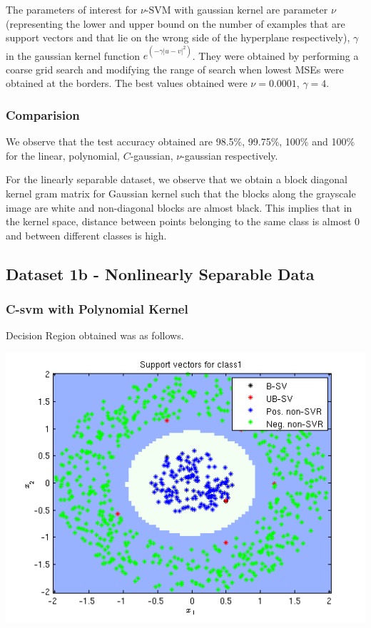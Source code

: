 \documentclass{article}
\begin{document}
The parameters of interest for $\nu$-SVM with gaussian kernel are parameter $\nu$(representing the lower and upper bound on the number of examples that are support vectors and that lie on the wrong side of the hyperplane respectively), $\gamma$ in the gaussian kernel function $e^{(-\gamma|u-v|^{2})}$. They were obtained by performing a coarse grid search and modifying the range of search when lowest MSEs were obtained at the borders.
The best values obtained were $\nu=0.0001$, $\gamma=4$.

\subsubsection{Comparision}
We observe that the test accuracy obtained are 98.5\%, 99.75\%, 100\% and 100\% for the linear, polynomial, $C$-gaussian, $\nu$-gaussian respectively. 

For the linearly separable dataset, we observe that we obtain a block diagonal kernel gram matrix for Gaussian kernel such that the blocks along the grayscale image are white and non-diagonal blocks are almost black. This implies that in the kernel space, distance between points belonging to the same class is almost 0 and between different classes is high.

\newpage
\subsection{Dataset 1b - Nonlinearly Separable Data}


\subsubsection{C-svm with Polynomial Kernel}

Decision Region obtained was as follows.
\begin{center}
\includegraphics[scale=1]{Classification/1b/c_poly/dec}
\end{center}
\end{document}
